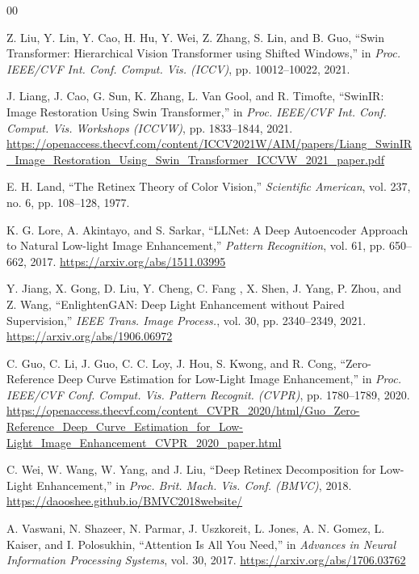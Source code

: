 \documentclass[sigconf]{acmart}
\begin{document}
\begin{thebibliography}{00}

Z. Liu, Y. Lin, Y. Cao, H. Hu, Y. Wei, Z. Zhang, S. Lin, and B. Guo, ``Swin Transformer: Hierarchical Vision Transformer using Shifted Windows,'' in \textit{Proc. IEEE/CVF Int. Conf. Comput. Vis. (ICCV)}, pp. 10012--10022, 2021.

J. Liang, J. Cao, G. Sun, K. Zhang, L. Van Gool, and R. Timofte, ``SwinIR: Image Restoration Using Swin Transformer,'' in \textit{Proc. IEEE/CVF Int. Conf. Comput. Vis. Workshops (ICCVW)}, pp. 1833--1844, 2021. \url{https://openaccess.thecvf.com/content/ICCV2021W/AIM/papers/Liang_SwinIR_Image_Restoration_Using_Swin_Transformer_ICCVW_2021_paper.pdf}

E. H. Land, ``The Retinex Theory of Color Vision,'' \textit{Scientific American}, vol. 237, no. 6, pp. 108--128, 1977.

K. G. Lore, A. Akintayo, and S. Sarkar, ``LLNet: A Deep Autoencoder Approach to Natural Low-light Image Enhancement,'' \textit{Pattern Recognition}, vol. 61, pp. 650--662, 2017. \url{https://arxiv.org/abs/1511.03995}

Y. Jiang, X. Gong, D. Liu, Y. Cheng, C. Fang , X. Shen, J. Yang, P. Zhou, and Z. Wang, ``EnlightenGAN: Deep Light Enhancement without Paired Supervision,'' \textit{IEEE Trans. Image Process.}, vol. 30, pp. 2340--2349, 2021. \url{https://arxiv.org/abs/1906.06972}

C. Guo, C. Li, J. Guo, C. C. Loy, J. Hou, S. Kwong, and R. Cong, ``Zero-Reference Deep Curve Estimation for Low-Light Image Enhancement,'' in \textit{Proc. IEEE/CVF Conf. Comput. Vis. Pattern Recognit. (CVPR)}, pp. 1780--1789, 2020. \url{https://openaccess.thecvf.com/content_CVPR_2020/html/Guo_Zero-Reference_Deep_Curve_Estimation_for_Low-Light_Image_Enhancement_CVPR_2020_paper.html}

C. Wei, W. Wang, W. Yang, and J. Liu, ``Deep Retinex Decomposition for Low-Light Enhancement,'' in \textit{Proc. Brit. Mach. Vis. Conf. (BMVC)}, 2018. \url{https://daooshee.github.io/BMVC2018website/}

A. Vaswani, N. Shazeer, N. Parmar, J. Uszkoreit, L. Jones, A. N. Gomez, L. Kaiser, and I. Polosukhin, ``Attention Is All You Need,'' in \textit{Advances in Neural Information Processing Systems}, vol. 30, 2017. \url{https://arxiv.org/abs/1706.03762}


\end{thebibliography}
\end{document}
